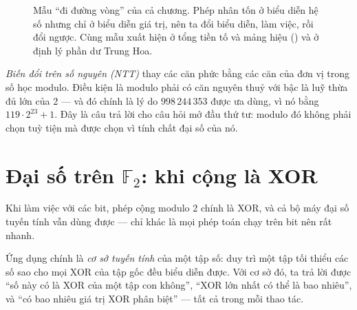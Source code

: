 \documentclass[../../algorithm.tex]{subfiles}
\begin{document}
\begin{figure}[H]\centering
{}
\caption{Mẫu ``đi đường vòng'' của cả chương. Phép nhân tốn  ở biểu diễn hệ số nhưng chỉ  ở biểu diễn giá trị, nên ta đổi biểu diễn, làm việc, rồi đổi ngược. Cùng mẫu xuất hiện ở tổng tiền tố và mảng hiệu () và ở định lý phần dư Trung Hoa.}
\label{fig:fft-detour}
\end{figure}

\emph{Biến đổi trên số nguyên (NTT)} thay các căn phức bằng các căn của đơn vị trong số học modulo. Điều kiện là modulo phải có căn nguyên thuỷ với bậc là luỹ thừa đủ lớn của 2 --- và đó chính là lý do \(998\,244\,353\) được ưa dùng, vì nó bằng \(119\cdot 2^{23}+1\). Đây là câu trả lời cho câu hỏi mở đầu thứ tư: modulo đó không phải chọn tuỳ tiện mà được chọn vì tính chất đại số của nó.

\section{Đại số trên \(\mathbb{F}_2\): khi cộng là XOR}

Khi làm việc với các bit, phép cộng modulo 2 chính là XOR, và cả bộ máy đại số tuyến tính vẫn dùng được --- chỉ khác là mọi phép toán chạy trên bit nên rất nhanh.

Ứng dụng chính là \emph{cơ sở tuyến tính} của một tập số: duy trì một tập tối thiểu các số sao cho mọi XOR của tập gốc đều biểu diễn được. Với cơ sở đó, ta trả lời được ``số này có là XOR của một tập con không'', ``XOR lớn nhất có thể là bao nhiêu'', và ``có bao nhiêu giá trị XOR phân biệt'' --- tất cả trong  mỗi thao tác.
\end{document}
